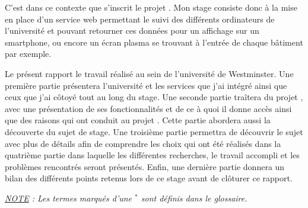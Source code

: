 C'est dans ce contexte que s'inscrit le projet \YuukouII. 
Mon stage consiste donc \`a la mise en place d'un service web permettant le suivi des diff\'erents ordinateurs de l'universit\'e et pouvant retourner ces donn\'ees pour un affichage sur un smartphone, ou encore un \'ecran plasma se trouvant \`a l'entr\'ee de chaque b\^atiment par exemple.

Le pr\'esent rapport  le travail r\'ealis\'e au sein de l'universit\'e de Westminster.
Une premi\`ere partie pr\'esentera l'universit\'e et les services que j'ai int\'egr\'e ainsi que ceux que j'ai c\^otoy\'e tout au long du stage.
Une seconde partie tra\^itera du projet \Yuukou{}, avec une pr\'esentation de ses fonctionnalit\'es et de ce \`a quoi il donne acc\`es  ainsi que des raisons qui ont conduit au projet \YuukouII.
Cette partie abordera aussi la d\'ecouverte du sujet de stage.
Une troisi\`eme partie permettra de d\'ecouvrir le sujet avec plus de d\'etails afin de comprendre les choix qui ont \'et\'e r\'ealis\'es dans la quatri\`eme partie dans laquelle les diff\'erentes recherches, le travail accompli et les probl\`emes rencontr\'es seront pr\'esent\'es.
Enfin, une derni\`ere partie donnera un bilan des diff\'erents points retenus lors de ce stage avant de cl\^oturer ce rapport.

\vspace{1.5cm}

\begin{center}
\textit{\underline{NOTE} : Les termes marqu\'es d'une $^*$ sont d\'efinis dans le glossaire.}

\end{center}

\clearpage
